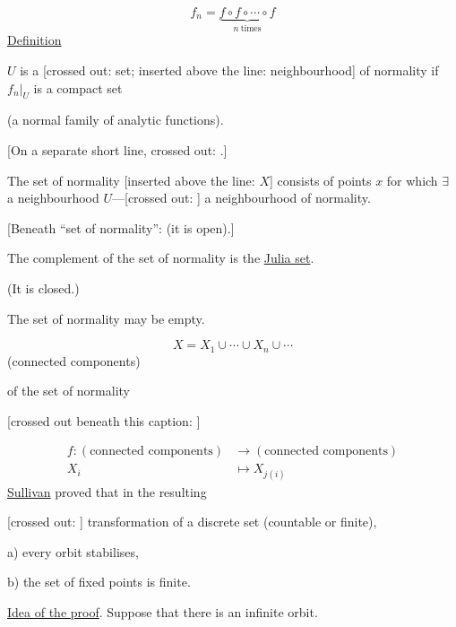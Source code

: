 \begin{equation*}
f_n=\underbrace{f\circ f\circ\cdots\circ f}_{n\ \text{times}}
\end{equation*}
\underline{Definition}

$U$ is a [crossed out: set; inserted above the line: neighbourhood]
of normality if $\left.f_n\right|_U$ is a compact set

(a normal family of analytic functions).

[On a separate short line, crossed out:
.]

The set of normality [inserted above the line: $X$] consists of points $x$ for which
$\exists$ a neighbourhood $U$---[crossed out:
]
a neighbourhood of normality.

[Beneath ``set of normality'': (it is open).]

The complement of the set of normality is the \underline{Julia set}.

(It is closed.)

The set of normality may be empty.

\begin{equation*}
X=X_1\cup\cdots\cup X_n\cup\cdots
\end{equation*}
(connected components)

of the set of normality

[crossed out beneath this caption:
]

\begin{equation*}
\begin{aligned}
f\colon (\text{connected components})&\to(\text{connected components})\\
X_i&\mapsto X_{j(i)}
\end{aligned}
\end{equation*}
\underline{Sullivan} proved that in the resulting

[crossed out: ]
transformation of a discrete set (countable or finite),

a) every orbit stabilises,

b) the set of fixed points is finite.

\underline{Idea of the proof}. Suppose that there is an infinite orbit.

